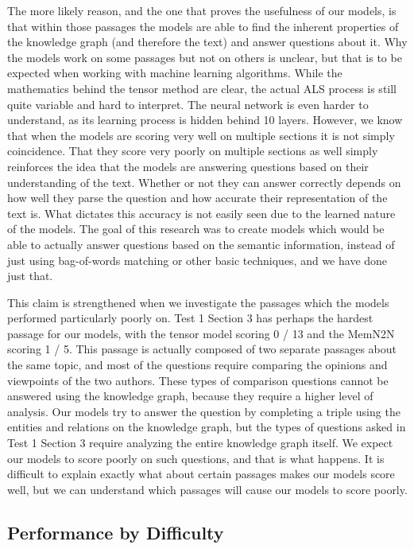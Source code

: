 \documentclass[pageno]{final_paper}
\begin{document}
The more likely reason, and the one that proves the usefulness of our models, is
that within those passages the models are able to find the inherent properties
of the knowledge graph (and therefore the text) and answer questions about it.
Why the models work on some passages but not on others is unclear, but that is
to be expected when working with machine learning algorithms. While the
mathematics behind the tensor method are clear, the actual ALS process is still
quite variable and hard to interpret. The neural network is even harder to
understand, as its learning process is hidden behind 10 layers. However, we know
that when the models are scoring very well on multiple sections it is not simply
coincidence. That they score very poorly on multiple sections as well simply
reinforces the idea that the models are answering questions based on their
understanding of the text. Whether or not they can answer correctly depends on
how well they parse the question and how accurate their representation of the
text is. What dictates this accuracy is not easily seen due to the learned
nature of the models. The goal of this research was to create models which would
be able to actually answer questions based on the semantic information, instead
of just using bag-of-words matching or other basic techniques, and we have done
just that.

This claim is strengthened when we investigate the passages which the models
performed particularly poorly on. Test 1 Section 3 has perhaps the hardest
passage for our models, with the tensor model scoring 0 / 13 and the MemN2N
scoring 1 / 5. This passage is actually composed of two separate passages about
the same topic, and most of the questions require comparing the opinions and
viewpoints of the two authors. These types of comparison questions cannot be
answered using the knowledge graph, because they require a higher level of
analysis. Our models try to answer the question by completing a triple using the
entities and relations on the knowledge graph, but the types of questions asked
in Test 1 Section 3 require analyzing the entire knowledge graph itself. We
expect our models to score poorly on such questions, and that is what happens.
It is difficult to explain exactly what about certain passages makes our models
score well, but we can understand which passages will cause our models to score
poorly.

\subsection{Performance by Difficulty}
\label{Performance by Difficulty}
\end{document}
